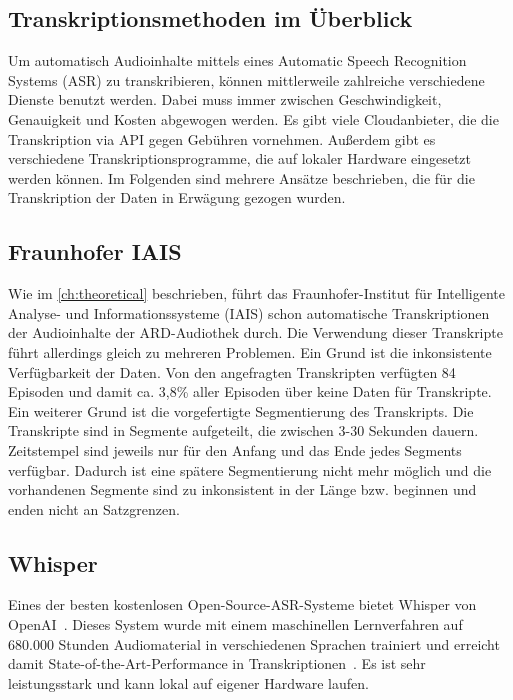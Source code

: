 \subsection{Transkriptionsmethoden im Überblick}

Um automatisch Audioinhalte mittels eines Automatic Speech Recognition Systems (ASR) zu transkribieren, können mittlerweile zahlreiche verschiedene Dienste benutzt werden.
Dabei muss immer zwischen Geschwindigkeit, Genauigkeit und Kosten abgewogen werden.
Es gibt viele Cloudanbieter, die die Transkription via API gegen Gebühren vornehmen.
Außerdem gibt es verschiedene Transkriptionsprogramme, die auf lokaler Hardware eingesetzt werden können.
Im Folgenden sind mehrere Ansätze beschrieben, die für die Transkription der Daten in Erwägung gezogen wurden.

\subsection{Fraunhofer IAIS}

Wie im \autoref{ch:theoretical} beschrieben, führt das Fraunhofer-Institut für Intelligente Analyse- und Informationssysteme (IAIS) schon automatische Transkriptionen der Audioinhalte der ARD-Audiothek durch.
Die Verwendung dieser Transkripte führt allerdings gleich zu mehreren Problemen.
Ein Grund ist die inkonsistente Verfügbarkeit der Daten.
Von den angefragten Transkripten verfügten 84 Episoden und damit ca. 3,8\% aller Episoden über keine Daten für Transkripte.
Ein weiterer Grund ist die vorgefertigte Segmentierung des Transkripts.
Die Transkripte sind in Segmente aufgeteilt, die zwischen 3-30 Sekunden dauern.
Zeitstempel sind jeweils nur für den Anfang und das Ende jedes Segments verfügbar.
Dadurch ist eine spätere Segmentierung nicht mehr möglich und die vorhandenen Segmente sind zu inkonsistent in der Länge bzw. beginnen und enden nicht an Satzgrenzen.

\subsection{Whisper}

Eines der besten kostenlosen Open-Source-ASR-Systeme bietet Whisper von OpenAI~\cite{radford}.
Dieses System wurde mit einem maschinellen Lernverfahren auf 680.000 Stunden Audiomaterial in verschiedenen Sprachen trainiert und erreicht damit State-of-the-Art-Performance in Transkriptionen~\cite{radford}.
Es ist sehr leistungsstark und kann lokal auf eigener Hardware laufen.

